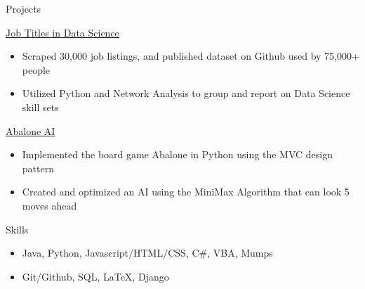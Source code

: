 
	\begin{cvsection}{Projects}
		\begin{cvsubsection}{\href{https://github.com/picklesueat/data_jobs_data}{\underline{Job Titles in Data Science}}}{}{}
			\begin{itemize}
				\item   Scraped 30,000 job listings, and published dataset on Github used by 75,000+ people
				\item Utilized Python and Network Analysis to group and report on Data Science skill sets
			\end{itemize}
		\end{cvsubsection}
		\begin{cvsubsection}{\href{https://github.com/picklesueat/Abalone}{\underline{Abalone AI}}}{}{}
			\begin{itemize}
				\item   Implemented the board game Abalone in Python using the MVC design pattern
				\item Created and optimized an AI using the MiniMax Algorithm that can look 5 moves ahead
			\end{itemize}
		\end{cvsubsection}
	\end{cvsection}
		


\begin{cvsection}{Skills}
	\begin{cvsubsection}{}{}{}	
		\begin{itemize}
			\item Java, Python, Javascript$/$HTML$/$CSS, C\#, VBA, Mumps
			\item  Git/Github, SQL, LaTeX, Django
		\end{itemize}
	\end{cvsubsection}
\end{cvsection}